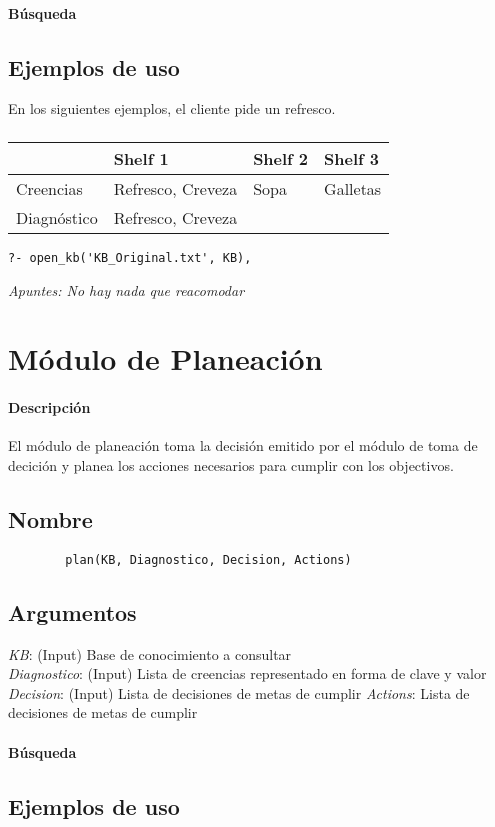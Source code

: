 \documentclass[11pt,fleqn]{article}
\begin{document}
\paragraph{Búsqueda} 

\subsection*{Ejemplos de uso}

En los siguientes ejemplos, el cliente pide un refresco.

\subsubsection{}
	\begin{tabular}{| l | l | l | l |}
		\hline
						& Shelf 1 & Shelf 2 & Shelf 3 \\ \hline
		Creencias		& Refresco, Creveza & Sopa & Galletas \\ \hline
		Diagnóstico		& Refresco, Creveza & & \\
		\hline
	\end{tabular}
	\begin{lstlisting}
?- open_kb('KB_Original.txt', KB), 
	\end{lstlisting}
	\textit{Apuntes: No hay nada que reacomodar}

\section{Módulo de Planeación}

\paragraph{Descripción} El módulo de planeación toma la decisión emitido por el módulo de toma de decición y planea los acciones necesarios para cumplir con los objectivos.

\subsection*{Nombre}
	\begin{verbatim}
		plan(KB, Diagnostico, Decision, Actions)
	\end{verbatim}

\subsection*{Argumentos}
	\textit{KB}: (Input) Base de conocimiento a consultar \\
	\textit{Diagnostico}: (Input) Lista de creencias representado en forma de clave y valor \\
	\textit{Decision}: (Input) Lista de decisiones de metas de cumplir 
	\textit{Actions}: Lista de decisiones de metas de cumplir 

\paragraph{Búsqueda} 

\subsection*{Ejemplos de uso}
\end{document}
